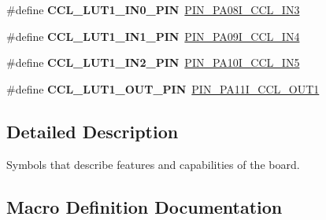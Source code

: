 \begin{DoxyCompactItemize}
\item 
\hypertarget{group__saml21__xplained__pro__features__group_ga316bea5fd5389a1062a62bca2ff3f31d}{}\#define {\bfseries C\+C\+L\+\_\+\+L\+U\+T1\+\_\+\+I\+N0\+\_\+\+P\+I\+N}~\hyperlink{pio_2saml21j18a_8h_a6c06888fff87f6f28a71f464a03ea33f}{P\+I\+N\+\_\+\+P\+A08\+I\+\_\+\+C\+C\+L\+\_\+\+I\+N3}\label{group__saml21__xplained__pro__features__group_ga316bea5fd5389a1062a62bca2ff3f31d}

\item 
\hypertarget{group__saml21__xplained__pro__features__group_ga9a290e402f24fe3b5b87376a3294669d}{}\#define {\bfseries C\+C\+L\+\_\+\+L\+U\+T1\+\_\+\+I\+N1\+\_\+\+P\+I\+N}~\hyperlink{pio_2saml21j18a_8h_a827efd76fa4be90a4dd33767af911379}{P\+I\+N\+\_\+\+P\+A09\+I\+\_\+\+C\+C\+L\+\_\+\+I\+N4}\label{group__saml21__xplained__pro__features__group_ga9a290e402f24fe3b5b87376a3294669d}

\item 
\hypertarget{group__saml21__xplained__pro__features__group_ga416bb4e729f37a797e993636a8754ce1}{}\#define {\bfseries C\+C\+L\+\_\+\+L\+U\+T1\+\_\+\+I\+N2\+\_\+\+P\+I\+N}~\hyperlink{pio_2saml21j18a_8h_a47ec54e98c4d37f0dac0b400df3cf118}{P\+I\+N\+\_\+\+P\+A10\+I\+\_\+\+C\+C\+L\+\_\+\+I\+N5}\label{group__saml21__xplained__pro__features__group_ga416bb4e729f37a797e993636a8754ce1}

\item 
\hypertarget{group__saml21__xplained__pro__features__group_ga9edd3b0b01feb2ab634ec83d6b45244a}{}\#define {\bfseries C\+C\+L\+\_\+\+L\+U\+T1\+\_\+\+O\+U\+T\+\_\+\+P\+I\+N}~\hyperlink{pio_2saml21j18a_8h_a80fd62d5682a471c3f16b07cbff8a94b}{P\+I\+N\+\_\+\+P\+A11\+I\+\_\+\+C\+C\+L\+\_\+\+O\+U\+T1}\label{group__saml21__xplained__pro__features__group_ga9edd3b0b01feb2ab634ec83d6b45244a}

\end{DoxyCompactItemize}


\subsection{Detailed Description}
Symbols that describe features and capabilities of the board. 

\subsection{Macro Definition Documentation}
\hypertarget{group__saml21__xplained__pro__features__group_ga02581754b212d533d96cde56c8145c9b}{}
